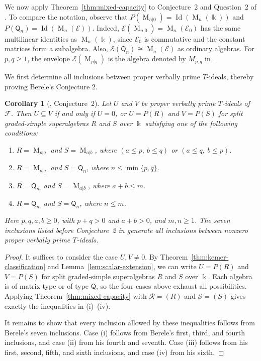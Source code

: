 \documentclass[11pt,reqno]{amsart}
\newcommand{\kk}{\Bbbk}
\newcommand{\F}{\mathcal F}
\newcommand{\E}{\mathcal E}
\newcommand{\Id}{\operatorname{Id}}
\newcommand{\Mat}{\operatorname{M}}
\newcommand{\Qtype}{\mathsf Q}
\newtheorem{corollary}[theorem]{Corollary}
\theoremstyle{definition}
\theoremstyle{remark}
\numberwithin{equation}{section}
\begin{document}
We now apply Theorem~\ref{thm:mixed-capacity} to
Conjecture~2 and Question~2 of \cite{Berele2012}.
To compare the notation, observe that
$P(\Mat_{n|0})=\Id(\Mat_n(\kk))$ and
$P(\Qtype_n)=\Id(\Mat_n(\E))$.
Indeed, $\E(\Mat_{n|0})=\Mat_n(\E_0)$ has the same
multilinear identities as $\Mat_n(\kk)$, since $\E_0$
is commutative and the constant matrices form a subalgebra.
Also, $\E(\Qtype_n)\cong\Mat_n(\E)$ as ordinary algebras.
For $p,q\geq1$, the envelope $\E(\Mat_{p|q})$ is the
algebra denoted by $M_{p,q}$ in \cite{Berele2012}.

We first determine all inclusions between proper
verbally prime $T$-ideals, thereby proving Berele’s Conjecture 2.

\begin{corollary}[\cite{Berele2012}, Conjecture~2]
\label{cor:prime-inclusions}
Let $U$ and $V$ be proper verbally prime $T$-ideals
of $\F$.
Then $U\subseteq V$ if and only if $U=0$, or
$U=P(R)$ and $V=P(S)$ for split graded-simple
superalgebras $R$ and $S$ over $\kk$ satisfying one of the
following conditions:
\begin{enumerate}
\item
$R=\Mat_{p|q}$ and $S=\Mat_{a|b}$, where
$(a\leq p,\ b\leq q)$ or $(a\leq q,\ b\leq p)$.
\item
$R=\Mat_{p|q}$ and $S=\Qtype_n$, where
$n\leq\min\{p,q\}$.
\item
$R=\Qtype_m$ and $S=\Mat_{a|b}$, where
$a+b\leq m$.
\item
$R=\Qtype_m$ and $S=\Qtype_n$, where $n\leq m$.
\end{enumerate}
Here $p,q,a,b\geq0$, with $p+q>0$ and $a+b>0$,
and $m,n\geq1$.
The seven inclusions listed before Conjecture~2
in \cite{Berele2012} generate all inclusions between
nonzero proper verbally prime $T$-ideals.
\end{corollary}

\begin{proof}
It suffices to consider the case $U,V\ne0$.
By Theorem~\ref{thm:kemer-classification} and
Lemma~\ref{lem:scalar-extension}, we can write
$U=P(R)$ and $V=P(S)$ for split graded-simple
superalgebras $R$ and $S$ over $\kk$.
Each algebra is of matrix type or of type $\Qtype$,
so the four cases above exhaust all possibilities.
Applying Theorem~\ref{thm:mixed-capacity} with
$\mathcal R=(R)$ and $\mathcal S=(S)$ gives
exactly the inequalities in \textup{(i)--(iv)}.

It remains to show that every inclusion allowed by
these inequalities follows from Berele's seven
inclusions.
Case \textup{(i)} follows from Berele's first, third,
and fourth inclusions, and case \textup{(ii)} from
his fourth and seventh.
Case \textup{(iii)} follows from his first, second,
fifth, and sixth inclusions, and case \textup{(iv)}
from his sixth.
\end{proof}
\end{document}
